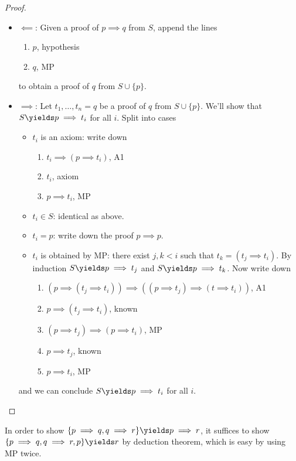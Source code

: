 \documentclass[a4paper]{article}
\begin{document}
\begin{proof}\leavevmode
  \begin{itemize}
  \item \(\impliedby\): Given a proof of \(p \implies q\) from \(S\), append the lines
    \begin{enumerate}
    \item \(p\), hypothesis
    \item \(q\), MP
    \end{enumerate}
    to obtain a proof of \(q\) from \(S \cup \{p\}\).
  \item \(\implies\): Let \(t_1, \dots, t_n = q\) be a proof of \(q\) from \(S \cup \{p\}\). We'll show that \(S \yields p \implies t_i\) for all \(i\). Split into cases
    \begin{itemize}
    \item \(t_i\) is an axiom: write down
      \begin{enumerate}
      \item \(t_i \implies (p \implies t_i)\), A1
      \item \(t_i\), axiom
      \item \(p \implies t_i\), MP
      \end{enumerate}
    \item \(t_i \in S\): identical as above.
    \item \(t_i = p\): write down the proof \(p \implies p\).
    \item \(t_i\) is obtained by MP: there exist \(j, k < i\) such that \(t_k = (t_j \implies t_i)\). By induction \(S \yields p \implies t_j\) and \(S \yields p \implies t_k\). Now write down
      \begin{enumerate}
      \item \((p \implies (t_j \implies t_i)) \implies ((p \implies t_j) \implies (t \implies t_i))\), A1
      \item \(p \implies (t_j \implies t_i)\), known
      \item \((p \implies t_j) \implies (p \implies t_i)\), MP
      \item \(p \implies t_j\), known
      \item \(p \implies t_i\), MP
      \end{enumerate}
    \end{itemize}
    and we can conclude \(S \yields p \implies t_i\) for all \(i\).
  \end{itemize}
\end{proof}

\begin{eg}
  In order to show \(\{p \implies q, q \implies r\} \yields p \implies r\), it suffices to show \(\{p \implies q, q \implies r, p\} \yields r\) by deduction theorem, which is easy by using MP twice.
\end{eg}
\end{document}
